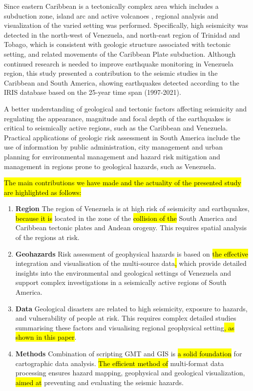 \documentclass[sustainability,article,submit,pdftex,moreauthors]{Definitions/mdpi}
\begin{document}
Since eastern Caribbean is a tectonically complex area which includes a subduction zone, island arc and active volcanoes \cite{Ambeh}, regional analysis and visualization of the varied setting was performed. Specifically, high seismicity was detected in the north-west of Venezuela, and north-east region of Trinidad and Tobago, which is consistent with geologic structure associated with tectonic setting, and related movements of the Caribbean Plate subduction. Although continued research is needed to improve earthquake monitoring in Venezuela region, this study presented a contribution to the seismic studies in the Caribbean and South America, showing earthquakes detected according to the IRIS database based on the 25-year time span (1997-2021). 

A better understanding of geological and tectonic factors affecting seismicity and regulating the appearance, magnitude and focal depth of the earthquakes is critical to seismically active regions, such as the Caribbean and Venezuela. Practical applications of geologic risk assessment in South America include the use of information by public administration, city management and urban planning for environmental management and hazard risk mitigation and management in regions prone to geological hazards, such as Venezuela. 

\hl{The main contributions we have made and the actuality of the presented study are highlighted as follows:}

\begin{enumerate}
  \item \textbf{Region} The region of Venezuela is at high risk of seismicity and earthquakes, \hl{because it is }located in the zone of the\hl{ collision of the }South America and Caribbean tectonic plates and Andean orogeny. This requires spatial analysis of the regions at risk.
  \item \textbf{Geohazards} Risk assessment of geophysical hazards is based on\hl{ the effective }integration and visualisation of the multi-source data\hl{, }which provide detailed insights into the environmental and geological settings of Venezuela and support complex investigations in a seismically active regions of South America. 
    \item \textbf{Data} Geological disasters are related to high seismicity, exposure to hazards, and vulnerability of people at risk. This requires complex detailed studies summarising these factors and visualising regional geophysical setting\hl{, as shown in this paper}.
   \item \textbf{Methods} Combination of scripting GMT and GIS is \hl{a solid foundation} for cartographic data analysis. \hl{The efficient method of }multi-format data processing ensures hazard mapping, geophysical and geological visualization, \hl{aimed at} preventing and evaluating the seismic hazards.
\end{enumerate}
\end{document}
